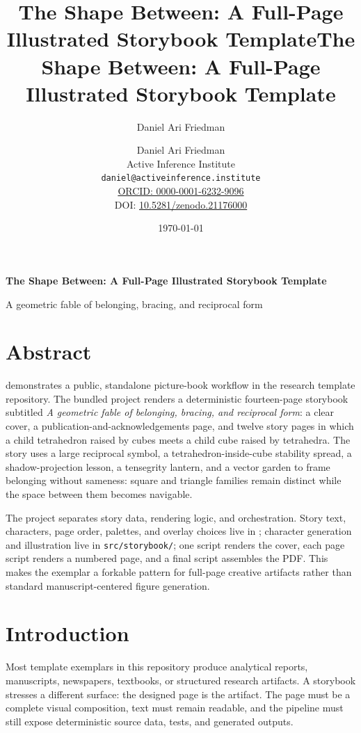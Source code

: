 \documentclass[
  english,
]{article}
\title{The Shape Between: A Full-Page Illustrated Storybook Template}
\author{Daniel Ari Friedman}
\date{}
\title{The Shape Between: A Full-Page Illustrated Storybook Template}
\author{Daniel Ari Friedman\\\footnotesize{Active Inference Institute}\\\footnotesize{\texttt{daniel@activeinference.institute}}\\\footnotesize{\href{https://orcid.org/0000-0001-6232-9096}{ORCID: 0000-0001-6232-9096}} \\ \footnotesize{DOI: \href{https://doi.org/10.5281/zenodo.21176000}{10.5281/zenodo.21176000}}}
\date{\today}
\begin{document}
\begin{titlepage}
\centering
\vspace*{2cm}
{\LARGE\bfseries The Shape Between: A Full-Page Illustrated Storybook Template\par}
\vspace{0.75em}
{\large A geometric fable of belonging, bracing, and reciprocal form\par}
\vfill
\makeatletter
{\@author\par}
\vspace{1em}
{\@date\par}
\makeatother
\vfill
\end{titlepage}
\thispagestyle{empty}
\tableofcontents
\newpage

\section{Abstract}\label{abstract}

 demonstrates a public, standalone
picture-book workflow in the research template repository. The bundled
project renders a deterministic fourteen-page storybook subtitled
\emph{A geometric fable of belonging, bracing, and reciprocal form}: a
clear cover, a publication-and-acknowledgements page, and twelve story
pages in which a child tetrahedron raised by cubes meets a child cube
raised by tetrahedra. The story uses a large reciprocal symbol, a
tetrahedron-inside-cube stability spread, a shadow-projection lesson, a
tensegrity lantern, and a vector garden to frame belonging without
sameness: square and triangle families remain distinct while the space
between them becomes navigable.

The project separates story data, rendering logic, and orchestration.
Story text, characters, page order, palettes, and overlay choices live
in ; character generation and illustration
live in \texttt{src/storybook/}; one script renders the cover, each page
script renders a numbered page, and a final script assembles the PDF.
This makes the exemplar a forkable pattern for full-page creative
artifacts rather than standard manuscript-centered figure generation.

\newpage

\section{Introduction}\label{introduction}

Most template exemplars in this repository produce analytical reports,
manuscripts, newspapers, textbooks, or structured research artifacts. A
storybook stresses a different surface: the designed page is the
artifact. The page must be a complete visual composition, text must
remain readable, and the pipeline must still expose deterministic source
data, tests, and generated outputs.
\end{document}
